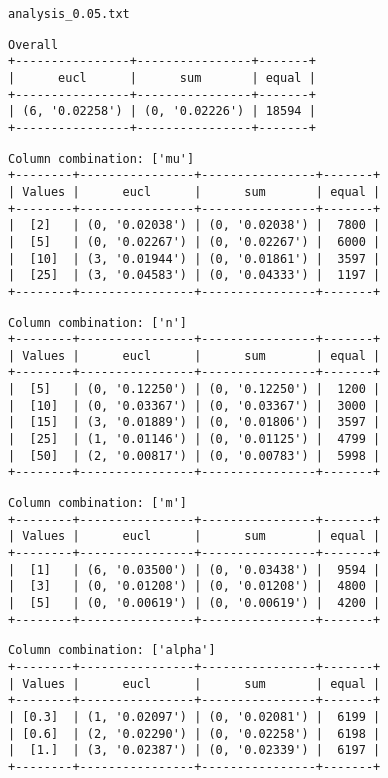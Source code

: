 \documentclass{article}
\begin{document}
\begin{verbatim}

\end{verbatim}

\newpage
\verb|analysis_0.05.txt|
\begin{verbatim}
Overall
+----------------+----------------+-------+
|      eucl      |      sum       | equal |
+----------------+----------------+-------+
| (6, '0.02258') | (0, '0.02226') | 18594 |
+----------------+----------------+-------+
\end{verbatim}

\begin{verbatim}
Column combination: ['mu']
+--------+----------------+----------------+-------+
| Values |      eucl      |      sum       | equal |
+--------+----------------+----------------+-------+
|  [2]   | (0, '0.02038') | (0, '0.02038') |  7800 |
|  [5]   | (0, '0.02267') | (0, '0.02267') |  6000 |
|  [10]  | (3, '0.01944') | (0, '0.01861') |  3597 |
|  [25]  | (3, '0.04583') | (0, '0.04333') |  1197 |
+--------+----------------+----------------+-------+
\end{verbatim}

\begin{verbatim}
Column combination: ['n']
+--------+----------------+----------------+-------+
| Values |      eucl      |      sum       | equal |
+--------+----------------+----------------+-------+
|  [5]   | (0, '0.12250') | (0, '0.12250') |  1200 |
|  [10]  | (0, '0.03367') | (0, '0.03367') |  3000 |
|  [15]  | (3, '0.01889') | (0, '0.01806') |  3597 |
|  [25]  | (1, '0.01146') | (0, '0.01125') |  4799 |
|  [50]  | (2, '0.00817') | (0, '0.00783') |  5998 |
+--------+----------------+----------------+-------+
\end{verbatim}

\begin{verbatim}
Column combination: ['m']
+--------+----------------+----------------+-------+
| Values |      eucl      |      sum       | equal |
+--------+----------------+----------------+-------+
|  [1]   | (6, '0.03500') | (0, '0.03438') |  9594 |
|  [3]   | (0, '0.01208') | (0, '0.01208') |  4800 |
|  [5]   | (0, '0.00619') | (0, '0.00619') |  4200 |
+--------+----------------+----------------+-------+
\end{verbatim}

\begin{verbatim}
Column combination: ['alpha']
+--------+----------------+----------------+-------+
| Values |      eucl      |      sum       | equal |
+--------+----------------+----------------+-------+
| [0.3]  | (1, '0.02097') | (0, '0.02081') |  6199 |
| [0.6]  | (2, '0.02290') | (0, '0.02258') |  6198 |
|  [1.]  | (3, '0.02387') | (0, '0.02339') |  6197 |
+--------+----------------+----------------+-------+
\end{verbatim}
\end{document}
